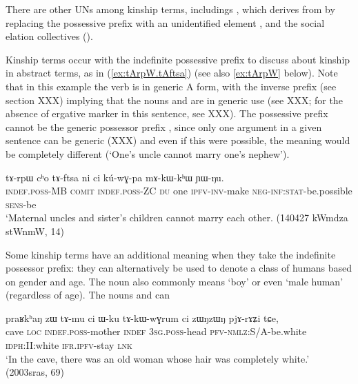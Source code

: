 There are other UNs among kinship terms, includings , which derives from  by replacing the possessive prefix with an unidentified element , and the social elation collectives ().

Kinship terms occur with the indefinite possessive prefix to discuss about kinship in abstract terms, as in (\ref{ex:tArpW.tAftsa}) (see also \ref{ex:tArpW} below). Note that in this example the verb is in generic A form, with the inverse prefix (see section XXX) implying that the nouns  and  are in generic use (see XXX; for the absence of ergative marker in this sentence, see XXX). The possessive prefix cannot be the generic possessor prefix , since only one argument in a given sentence can be generic (XXX) and even if this were possible, the meaning would be completely different (`One's uncle cannot marry one's nephew').

\begin{exe}
\ex \label{ex:tArpW.tAftsa}
\gll tɤ-rpɯ cʰo tɤ-ftsa ni ci kú-wɣ-pa mɤ-kɯ-kʰɯ ɲɯ-ŋu. \\
\textsc{indef.poss}-MB \textsc{comit} \textsc{indef.poss}-ZC \textsc{du} one \textsc{ipfv}-\textsc{inv}-make \textsc{neg}-\textsc{inf}:\textsc{stat}-be.possible  \textsc{sens}-be \\
\glt `Maternal uncles and sister's children cannot marry each other.  (140427 kWmdza stWnmW, 14)
\end{exe}

Some kinship terms have an additional meaning when they take the indefinite possessor prefix: they can alternatively be used to denote a class of humans based on gender and age. The noun  also commonly means `boy' or even `male human' (regardless of age). The nouns  and  can


\begin{exe}
\ex \label{ex:tAmu.ci}
\gll praʁkʰaŋ  zɯ tɤ-mu ci ɯ-ku tɤ-kɯ-wɣrum ci zɯŋzɯŋ pjɤ-rɤʑi tɕe, \\
cave \textsc{loc} \textsc{indef.poss}-mother \textsc{indef} \textsc{3sg}.\textsc{poss}-head \textsc{pfv}-\textsc{nmlz}:S/A-be.white \textsc{idph}:II:white \textsc{ifr}.\textsc{ipfv}-stay \textsc{lnk} \\
\glt `In the cave, there was an old woman whose hair was completely white.' (2003sras, 69)
\end{exe}

